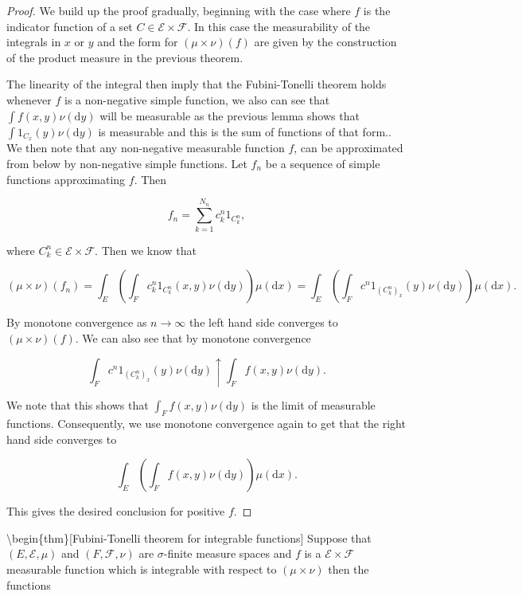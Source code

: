 \documentclass[
]{book}
\theoremstyle{definition}
\theoremstyle{definition}
\theoremstyle{definition}
\theoremstyle{definition}
\theoremstyle{remark}
\begin{document}
\begin{proof}
We build up the proof gradually, beginning with the case where \(f\) is the indicator function of a set \(C \in \mathcal{E} \times \mathcal{F}\). In this case the measurability of the integrals in \(x\) or \(y\) and the form for \((\mu \times \nu)(f)\) are given by the construction of the product measure in the previous theorem.

The linearity of the integral then imply that the Fubini-Tonelli theorem holds whenever \(f\) is a non-negative simple function, we also can see that \(\int f(x,y) \nu(\mathrm{d}y)\) will be measurable as the previous lemma shows that \(\int 1_{C_x}(y) \nu(\mathrm{d}y)\) is measurable and this is the sum of functions of that form.. We then note that any non-negative measurable function \(f\), can be approximated from below by non-negative simple functions. Let \(f_n\) be a sequence of simple functions approximating \(f\). Then

\[ f_n = \sum_{k=1}^{N_n} c^n_k 1_{C^n_k}, \]

where \(C^n_k \in \mathcal{E} \times \mathcal{F}\). Then we know that

\[ (\mu \times \nu)(f_n) = \int_E \left( \int_F c^n_k 1_{C^n_k}(x,y) \nu(\mathrm{d}y) \right) \mu(\mathrm{d}x) = \int_E \left( \int_F c^n 1_{(C^n_k)_x}(y) \nu(\mathrm{d}y) \right)\mu(\mathrm{d}x). \]

By monotone convergence as \(n \rightarrow \infty\) the left hand side converges to \((\mu \times \nu)(f)\). We can also see that by monotone convergence

\[ \int_F c^n 1_{(C^n_k)_x}(y) \nu(\mathrm{d}y) \uparrow \int_F f(x,y) \nu(\mathrm{d}y). \]

We note that this shows that \(\int_F f(x,y) \nu(\mathrm{d}y)\) is the limit of measurable functions. Consequently, we use monotone convergence again to get that the right hand side converges to

\[ \int_E \left( \int_F f(x,y) \nu(\mathrm{d}y) \right) \mu(\mathrm{d}x). \]

This gives the desired conclusion for positive \(f\).
\end{proof}

\textbackslash begin\{thm\}{[}Fubini-Tonelli theorem for integrable functions{]}
Suppose that \((E, \mathcal{E}, \mu)\) and \((F, \mathcal{F}, \nu)\) are \(\sigma\)-finite measure spaces and \(f\) is a \(\mathcal{E} \times \mathcal{F}\) measurable function which is integrable with respect to \((\mu \times \nu)\) then the functions
\end{document}
